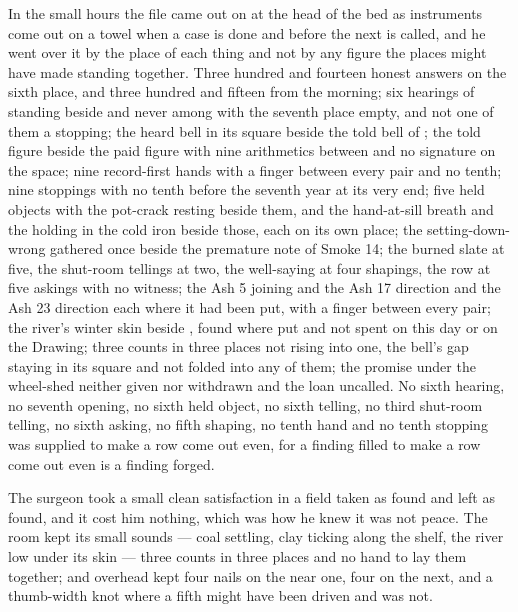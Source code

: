 \scenebreak

In the small hours the file came out on  at the head of the bed as instruments come out on a towel when a case is done and before the next is called, and he went over it by the place of each thing and not by any figure the places might have made standing together. Three hundred and fourteen honest answers on the sixth place, and three hundred and fifteen from the morning; six hearings of  standing beside and never among with the seventh place empty, and not one of them a stopping; the heard bell in its square beside the told bell of ; the told figure beside the paid figure with nine arithmetics between and no signature on the space; nine record-first hands with a finger between every pair and no tenth; nine stoppings with no tenth before the seventh year at its very end; five held objects with the pot-crack resting beside them, and the hand-at-sill breath and the holding in the cold iron beside those, each on its own place; the setting-down-wrong gathered once beside the premature note of Smoke 14; the burned slate at five, the shut-room tellings at two, the well-saying at four shapings, the row at five askings with no witness; the Ash 5 joining and the Ash 17 direction and the Ash 23 direction each where it had been put, with a finger between every pair; the river's winter skin beside , found where put and not spent on this day or on the Drawing; three counts in three places not rising into one, the bell's gap staying in its square and not folded into any of them; the promise under the wheel-shed neither given nor withdrawn and the loan uncalled. No sixth hearing, no seventh opening, no sixth held object, no sixth telling, no third shut-room telling, no sixth asking, no fifth shaping, no tenth hand and no tenth stopping was supplied to make a row come out even, for a finding filled to make a row come out even is a finding forged.

The surgeon took a small clean satisfaction in a field taken as found and left as found, and it cost him nothing, which was how he knew it was not peace. The room kept its small sounds --- coal settling, clay ticking along the shelf, the river low under its skin --- three counts in three places and no hand to lay them together; and overhead  kept four nails on the near one, four on the next, and a thumb-width knot where a fifth might have been driven and was not.

